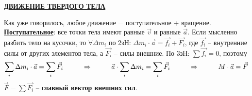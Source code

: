 \documentclass[12pt,epsfig,color,russian]{article}
\begin{document}
\sf\Large


\centerline{\underline{\Huge\bf ДВИЖЕНИЕ ТВЕРДОГО ТЕЛА}}

Как уже говорилось, любое движение = поступательное + вращение.\\
\underline{\bf Поступательное}: все точки тела имеют равные $\vec{v}$ и равные $\vec{a}$. Если мысленно разбить тело на кусочки, то $\forall \Delta m_i$ по 2зН: $\Delta m_i\cdot\vec{a}=\vec{f_i}+\vec{F_i}$, где $\vec{f_i}$ -- внутренние силы от других элементов тела, а $\vec{F_i}$ -- силы внешние. По 3зН: $\sum \vec{f_i}=0$, поэтому
\begin{displaymath}
\sum_i\Delta m_i\cdot\vec{a}=\sum_i\vec{F_i}\hspace{10mm}\Rightarrow\hspace{10mm}
\vec{a}\cdot\sum_i\Delta m_i=\sum_i\vec{F_i}\hspace{10mm}\Rightarrow\hspace{10mm}
M\cdot\vec{a}=\vec{F}
\end{displaymath}
$\vec{F}=\sum\vec{F_i}$ -- {\bf главный вектор внешних сил}.\\[2mm]
\\
\end{document}
